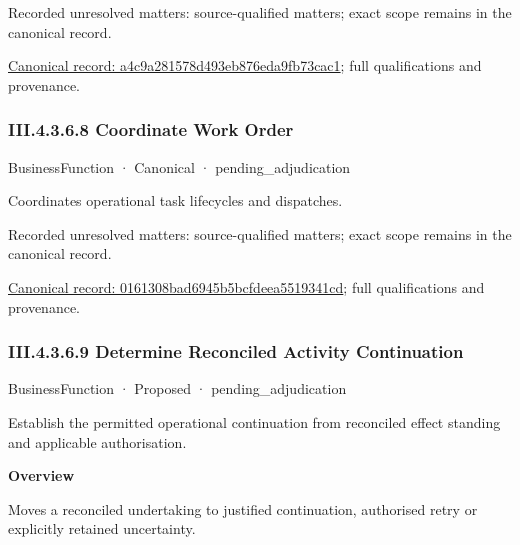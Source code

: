 {\small Recorded unresolved matters: source-qualified matters; exact scope remains in the canonical record.}\par
{\footnotesize \href{../../../../../../../../continuum/business/business-function/a4c9a281578d493eb876eda9fb73cac1.md}{Canonical record: a4c9a281578d493eb876eda9fb73cac1}; full qualifications and provenance.}\par
\subsubsection*{III.4.3.6.8 Coordinate Work Order}
\label{navigation:III.4.3.6.8}

\label{element:0161308bad6945b5bcfdeea5519341cd}
{\small BusinessFunction · Canonical · pending\_adjudication}\par

Coordinates operational task lifecycles and dispatches.


{\small Recorded unresolved matters: source-qualified matters; exact scope remains in the canonical record.}\par
{\footnotesize \href{../../../../../../../../continuum/business/business-function/0161308bad6945b5bcfdeea5519341cd.md}{Canonical record: 0161308bad6945b5bcfdeea5519341cd}; full qualifications and provenance.}\par
\subsubsection*{III.4.3.6.9 Determine Reconciled Activity Continuation}
\label{navigation:III.4.3.6.9}

\label{element:2e326eb5a06641048ad8a919723c4c51}
{\small BusinessFunction · Proposed · pending\_adjudication}\par

Establish the permitted operational continuation from reconciled effect standing and applicable authorisation.



\textbf{Overview}



Moves a reconciled undertaking to justified continuation, authorised retry or explicitly retained uncertainty.




